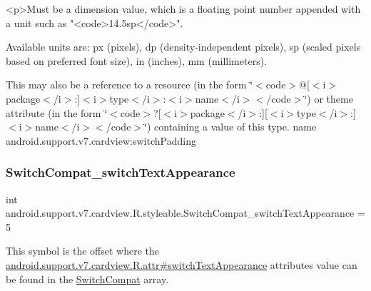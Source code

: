 \begin{DoxyVerb}      <p>Must be a dimension value, which is a floating point number appended with a unit such as "<code>14.5sp</code>".
\end{DoxyVerb}
 Available units are\+: px (pixels), dp (density-\/independent pixels), sp (scaled pixels based on preferred font size), in (inches), mm (millimeters). 

This may also be a reference to a resource (in the form \char`\"{}$<$code$>$@\mbox{[}$<$i$>$package$<$/i$>$\+:\mbox{]}$<$i$>$type$<$/i$>$\+:$<$i$>$name$<$/i$>$$<$/code$>$\char`\"{}) or theme attribute (in the form \char`\"{}$<$code$>$?\mbox{[}$<$i$>$package$<$/i$>$\+:\mbox{]}\mbox{[}$<$i$>$type$<$/i$>$\+:\mbox{]}$<$i$>$name$<$/i$>$$<$/code$>$\char`\"{}) containing a value of this type.  name android.\+support.\+v7.\+cardview\+:switch\+Padding \mbox{\label{classandroid_1_1support_1_1v7_1_1cardview_1_1R_1_1styleable_aee6b23536fd36623a9dd00ddd13596e8}} 
\subsubsection{\texorpdfstring{Switch\+Compat\+\_\+switch\+Text\+Appearance}{SwitchCompat\_switchTextAppearance}}
{\footnotesize\ttfamily int android.\+support.\+v7.\+cardview.\+R.\+styleable.\+Switch\+Compat\+\_\+switch\+Text\+Appearance = 5\hspace{0.3cm}{\ttfamily [static]}}

This symbol is the offset where the \hyperlink{classandroid_1_1support_1_1v7_1_1cardview_1_1R_1_1attr_a98c4d99255d0d40a6124ad8dbac74bf1}{android.\+support.\+v7.\+cardview.\+R.\+attr\#switch\+Text\+Appearance} attribute\textquotesingle{}s value can be found in the \hyperlink{classandroid_1_1support_1_1v7_1_1cardview_1_1R_1_1styleable_a8b1fbe9bb91473a7977ff98951ed5255}{Switch\+Compat} array.

